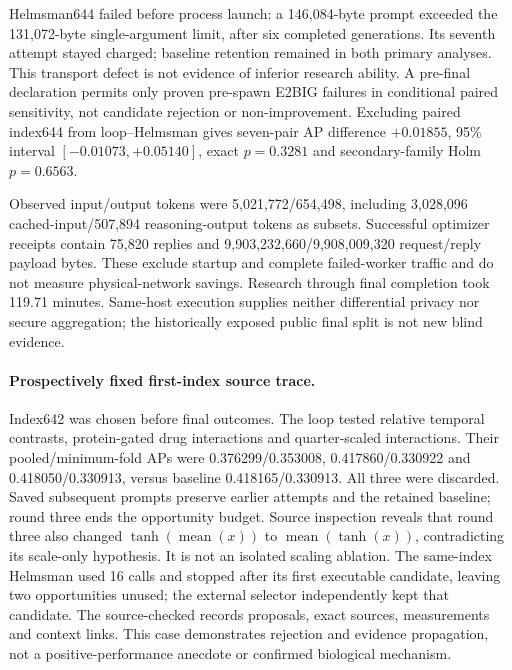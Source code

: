 Helmsman644 failed before process launch: a 146,084-byte prompt exceeded the 131,072-byte single-argument limit, after six completed generations. Its seventh attempt stayed charged; baseline retention remained in both primary analyses. This transport defect is not evidence of inferior research ability. A pre-final declaration permits only proven pre-spawn E2BIG failures in conditional paired sensitivity, not candidate rejection or non-improvement. Excluding paired index644 from loop--Helmsman gives seven-pair AP difference $+0.01855$, 95\% interval $[-0.01073,+0.05140]$, exact $p=0.3281$ and secondary-family Holm $p=0.6563$.

Observed input/output tokens were 5,021,772/654,498, including 3,028,096 cached-input/507,894 reasoning-output tokens as subsets. Successful optimizer receipts contain 75,820 replies and 9,903,232,660/9,908,009,320 request/reply payload bytes. These exclude startup and complete failed-worker traffic and do not measure physical-network savings. Research through final completion took 119.71 minutes. Same-host execution supplies neither differential privacy nor secure aggregation; the historically exposed public final split is not new blind evidence.

\paragraph{Prospectively fixed first-index source trace.}
Index642 was chosen before final outcomes. The loop tested relative temporal contrasts, protein-gated drug interactions and quarter-scaled interactions. Their pooled/minimum-fold APs were 0.376299/0.353008, 0.417860/0.330922 and 0.418050/0.330913, versus baseline 0.418165/0.330913. All three were discarded. Saved subsequent prompts preserve earlier attempts and the retained baseline; round three ends the opportunity budget. Source inspection reveals that round three also changed $\tanh(\operatorname{mean}(x))$ to $\operatorname{mean}(\tanh(x))$, contradicting its scale-only hypothesis. It is not an isolated scaling ablation. The same-index Helmsman used 16 calls and stopped after its first executable candidate, leaving two opportunities unused; the external selector independently kept that candidate. The source-checked  records proposals, exact sources, measurements and context links. This case demonstrates rejection and evidence propagation, not a positive-performance anecdote or confirmed biological mechanism.
